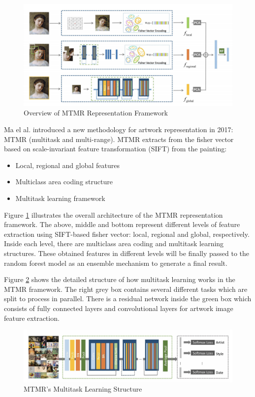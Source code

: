 \begin{figure}[h!]
\centering
\includegraphics[width=\textwidth]{MTMRoverview.pdf}
\caption{Overview of MTMR Representation Framework\cite{parttowhole}}
\label{fig:mtmroverview}
\end{figure}


Ma el al. \cite{parttowhole} introduced a new methodology for artwork representation in 2017: MTMR (multitask and multi-range). MTMR extracts from the fisher vector based on scale-invariant feature transformation (SIFT) from the painting:

\begin{itemize}
    \item Local, regional and global features
    \item Multiclass area coding structure
    \item Multitask learning framework
\end{itemize}

Figure \ref{fig:mtmroverview} illustrates the overall architecture of the MTMR representation framework. The above, middle and bottom represent different levels of feature extraction using SIFT-based fisher vector: local, regional and global, respectively. Inside each level, there are multiclass area coding and multitask learning structures. These obtained features in different levels will be finally passed to the random forest model as an ensemble mechanism to generate a final result.

Figure \ref{fig:mtmrmulti} shows the detailed structure of how multitask learning works in the MTMR framework. The right grey box contains several different tasks which are split to process in parallel. There is a residual network inside the green box which consists of fully connected layers and convolutional layers for artwork image feature extraction.


\begin{figure}[h!]
\centering
\includegraphics[width=\textwidth]{MTMRmultitask.pdf}
\caption{MTMR's Multitask Learning Structure\cite{parttowhole}}
\label{fig:mtmrmulti}
\end{figure}


